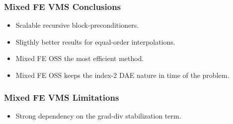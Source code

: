 \begin{frame}
\frametitle{Mixed FE VMS Conclusions}
\vfill
\begin{itemize}
\item<1-> Scalable recursive block-preconditioners.
\item<2-> Sligthly better results for equal-order interpolations.
\item<3-> Mixed FE OSS the most efficient method. 
\item<4-> Mixed FE OSS keeps the index-2 DAE nature in time of the problem.
\end{itemize}
\vfill
\end{frame}
\begin{frame}
\frametitle{Mixed FE VMS Limitations}
\vfill
\begin{itemize}
\item<1-> Strong dependency on the grad-div stabilization term.
\end{itemize}
\vfill
\end{frame}